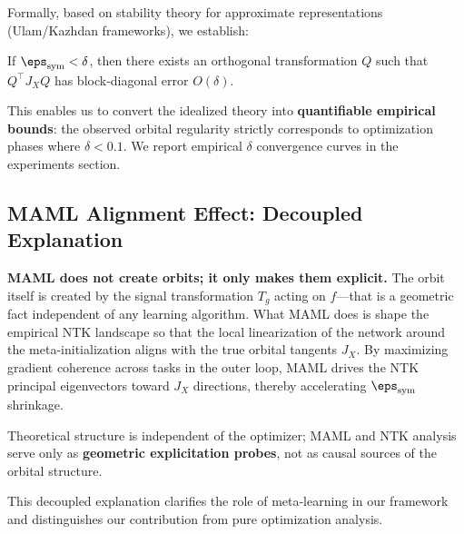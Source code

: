 Formally, based on stability theory for approximate representations (Ulam/Kazhdan frameworks), we establish:

\begin{prop}
If $\eps_{\mathrm{sym}} < \delta$, then there exists an orthogonal transformation $Q$ such that $Q^\top J_X Q$ has block-diagonal error $O(\delta)$.
\end{prop}

This enables us to convert the idealized theory into \textbf{quantifiable empirical bounds}:
the observed orbital regularity strictly corresponds to optimization phases where $\delta < 0.1$.
We report empirical $\delta$ convergence curves in the experiments section.



\subsection{MAML Alignment Effect: Decoupled Explanation}
\label{sec:maml_alignment}

\textbf{MAML does not create orbits; it only makes them explicit.}
The orbit itself is created by the signal transformation $T_g$ acting on $f$---that is a geometric fact independent of any learning algorithm.
What MAML does is shape the empirical NTK landscape so that the local linearization of the network around the meta-initialization aligns with the true orbital tangents $J_X$.
By maximizing gradient coherence across tasks in the outer loop, MAML drives the NTK principal eigenvectors toward $J_X$ directions, thereby accelerating $\eps_{\mathrm{sym}}$ shrinkage.

Theoretical structure is independent of the optimizer;
MAML and NTK analysis serve only as \textbf{geometric explicitation probes}, not as causal sources of the orbital structure.

This decoupled explanation clarifies the role of meta-learning in our framework and distinguishes our contribution from pure optimization analysis.


